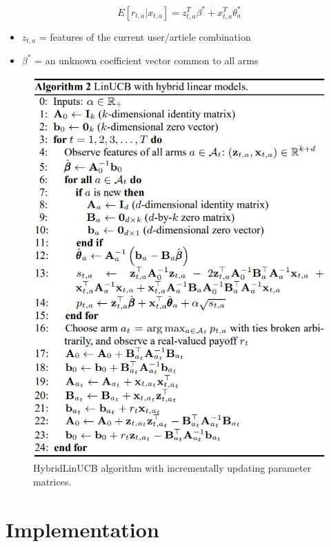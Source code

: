 \documentclass[12pt, titlepage]{article}
\begin{document}
$$
E[r_{t,a}|x_{t,a}] = z^T_{t,a}\beta^* + x^T_{t,a}\theta^*_a 
$$

\begin{itemize}
\item $z_{t,a}$ = features of the current user/article combination
\item $\beta^*$ = an unknown coefficient vector common to all arms
\end{itemize}

\begin{figure}[h!]
 \centering
 \includegraphics[scale=0.9]{img/HybridLinUCB_alg}
 \caption{HybridLinUCB algorithm with incrementally updating parameter matrices.}
 \label{fig:HybridlinUCB_alg}
\end{figure}


\section{Implementation}\label{sec:impl}
\end{document}
